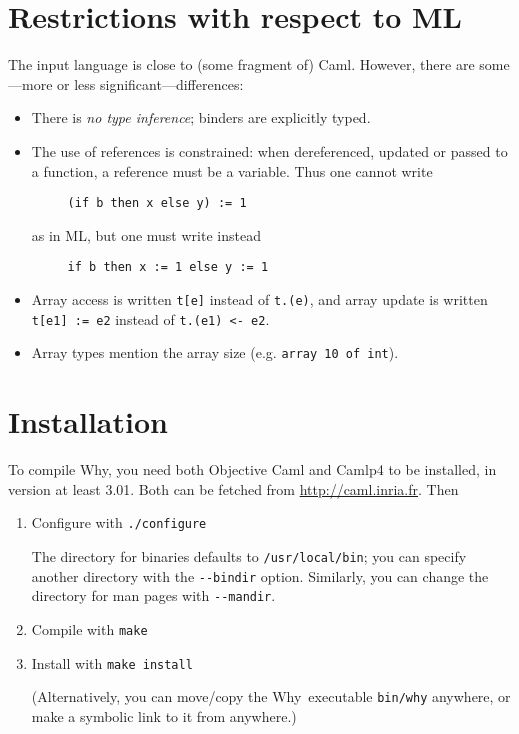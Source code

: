 \documentclass[a4paper,12pt]{report}
\newcommand{\caml}{\textsf{Caml}}
\newcommand{\why}{\textsf{Why}}
\begin{document}
\section{Restrictions with respect to ML}
The input language is close to (some fragment of) \caml. However,
there are some---more or less significant---differences:
\begin{itemize}
\item There is \textit{no type inference}; binders are explicitly
  typed. 
\item The use of references is constrained: when dereferenced, updated
  or passed to a function, a reference must be a variable. Thus one
  cannot write
\begin{verbatim}
     (if b then x else y) := 1
\end{verbatim}
as in ML, but one must write instead
\begin{verbatim}
     if b then x := 1 else y := 1
\end{verbatim}
\item Array access is written \texttt{t[e]} instead of \texttt{t.(e)},
  and array update is written \texttt{t[e1] := e2} instead of
  \texttt{t.(e1) <- e2}.
\item Array types mention the array size (e.g. \texttt{array 10 of int}).
\end{itemize}


\section{Installation}
\label{install}

To compile \why, you need both \textsf{Objective Caml} and
\textsf{Camlp4} to be installed, in version at least 3.01. Both can
be fetched from \url{http://caml.inria.fr}.
Then 

\begin{enumerate}
\item Configure with \texttt{./configure}

  The directory for binaries defaults to \texttt{/usr/local/bin}; you
  can specify another directory with the \texttt{-{}-bindir}
  option. Similarly, you can change the directory for man pages with
  \texttt{-{}-mandir}.

\item Compile with \texttt{make}

\item Install with \texttt{make install}

  (Alternatively, you can move/copy the \why\ executable
  \texttt{bin/why} anywhere, or make a symbolic link to it from anywhere.)
\end{enumerate}
\end{document}
